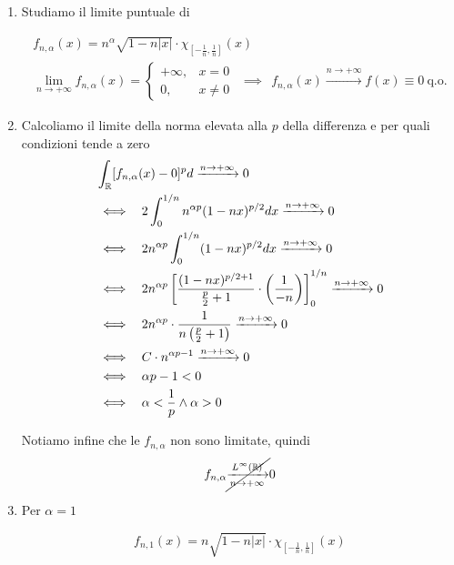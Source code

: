 \Soluzione
\begin{enumerate}
\item Studiamo il limite puntuale di

\begin{gather*}
f_{n,\alpha }(x) = n^{\alpha }\sqrt{1 - n| x| } \cdot \chi _{\left[ - \frac{1}{n} ,\frac{1}{n}\right]}(x)\\
\lim\limits _{n\rightarrow + \infty } f_{n,\alpha }(x) = 
\begin{cases}
+ \infty , & x = 0\\
0, & x\neq 0
\end{cases} \ \ \implies \ \ f_{n,\alpha }(x)\xrightarrow{n\rightarrow + \infty } f(x) \equiv 0\ \text{q.o.}
\end{gather*}
\item Calcoliamo il limite della norma elevata alla $p$ della differenza e per quali condizioni tende a zero
\begin{align*}
 & \int _{\mathbb{R} }[ f_{n,\alpha }(x) - 0]^{p} d\xrightarrow{n\rightarrow + \infty } 0\\
 & \iff \ \ 2\int ^{1/n}_{0} n^{\alpha p}(1 - nx)^{p/2} dx\xrightarrow{n\rightarrow + \infty } 0\\
 & \iff \ \ 2n^{\alpha p}\int ^{1/n}_{0}(1 - nx)^{p/2} dx\xrightarrow{n\rightarrow + \infty } 0\\
 & \iff \ \ 2n^{\alpha p}\left[\frac{(1 - nx)^{p/2 + 1}}{\frac{p}{2} + 1} \cdot \left(\frac{1}{ - n}\right)\right]^{1/n}_{0}\xrightarrow{n\rightarrow + \infty } 0\\
 & \iff \ \ 2n^{\alpha p} \cdot \frac{1}{n\left(\frac{p}{2} + 1\right)}\xrightarrow{n\rightarrow + \infty } 0\\
 & \iff \ \ C\cdot n^{\alpha p - 1}\xrightarrow{n\rightarrow + \infty } 0\\
 & \iff \ \ \alpha p - 1 < 0\\
 & \iff \ \ \alpha < \frac{1}{p} \land \alpha  > 0
\end{align*}

Notiamo infine che le $f_{n,\alpha }$ non sono limitate, quindi
\begin{equation*}
f_{n,\alpha }\cancel{\xrightarrow[n\rightarrow + \infty ]{L^{\infty }(\mathbb{R})}} 0
\end{equation*}
\item Per $\alpha = 1$

\begin{equation*}
f_{n,1}(x) = n\sqrt{1 - n| x| } \cdot \chi _{\left[ - \frac{1}{n} ,\frac{1}{n}\right]}(x)
\end{equation*}


\end{enumerate}
